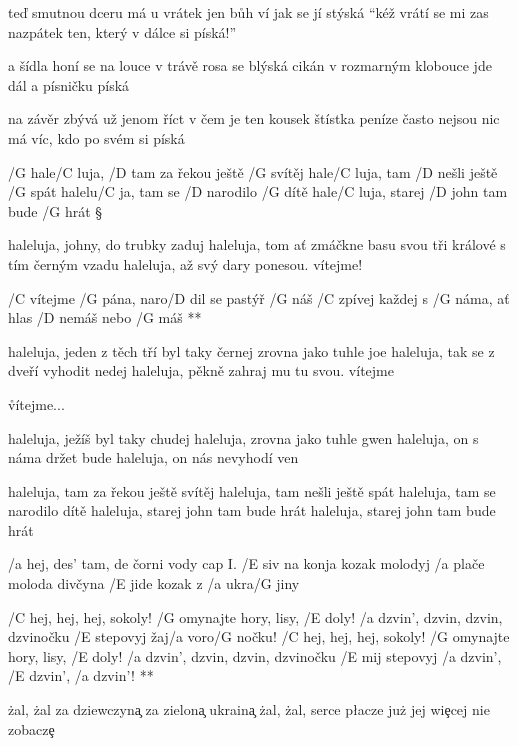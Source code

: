 teď smutnou dceru má u vrátek
jen bůh ví jak se jí stýská
``kéž vrátí se mi zas nazpátek
ten, který v dálce si píská!''\s

a šídla honí se na louce
v trávě rosa se blýská
cikán v rozmarným klobouce
jde dál a písničku píská \s

na závěr zbývá už jenom říct
v čem je ten kousek štístka
peníze často nejsou nic
má víc, kdo po svém si píská





/G hale/C luja, /D tam za řekou ještě /G svítěj
hale/C luja, tam /D nešli ještě /G spát
halelu/C ja, tam se /D narodilo /G dítě
hale/C luja, starej /D john tam bude /G hrát \S

haleluja, johny, do trubky zaduj
haleluja, tom ať zmáčkne basu svou
tři králové s tím černým vzadu
haleluja, až svý dary ponesou. vítejme!

\R  /C vítejme /G pána, naro/D dil se pastýř /G náš
    /C zpívej každej s /G náma, ať hlas /D nemáš nebo /G máš **

haleluja, jeden z těch tří byl taky černej
zrovna jako tuhle joe
haleluja, tak se z dveří vyhodit nedej
haleluja, pěkně zahraj mu tu svou. vítejme

\r vítejme...

haleluja, ježíš byl taky chudej
haleluja, zrovna jako tuhle gwen
haleluja, on s náma držet bude
haleluja, on nás nevyhodí ven

\rr

\rr

haleluja, tam za řekou ještě svítěj
haleluja, tam nešli ještě spát
haleluja, tam se narodilo dítě
haleluja, starej john tam bude hrát
haleluja, starej john tam bude hrát




/a hej, des' tam, de čorni vody \hfill cap I.
/E siv na konja kozak molodyj
/a plače moloda divčyna
/E jide kozak z /a ukra/G jiny

\R  /C hej, hej, hej, sokoly!
    /G omynajte hory, lisy, /E doly!
    /a dzvin', dzvin, dzvin, dzvinočku
    /E stepovyj žaj/a voro/G nočku! \s
    /C hej, hej, hej, sokoly!
    /G omynajte hory, lisy, /E doly!
    /a dzvin', dzvin, dzvin, dzvinočku
    /E mij stepovyj /a dzvin', /E dzvin', /a dzvin'! **

\. zal, \. zal za dziewczyn\c a
za zielon\c a ukrain\c a
\. zal, \. zal, serce p\l acze
ju\. z jej wi\c ecej nie zobacz\c e

